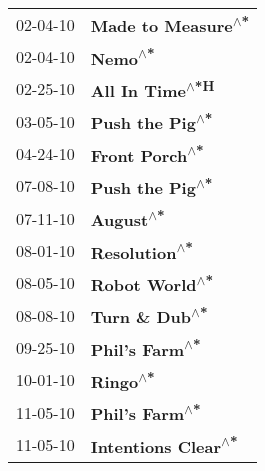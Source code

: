 \begin{supertabular}{p{0.25\columnwidth}p{0.75\columnwidth}}
 02-04-10 &   \textbf{Made to Measure\textsuperscript{$\wedge$*}} \\
 02-04-10 &              \textbf{Nemo\textsuperscript{$\wedge$*}} \\
 02-25-10 &      \textbf{All In Time\textsuperscript{$\wedge$*H}} \\
 03-05-10 &      \textbf{Push the Pig\textsuperscript{$\wedge$*}} \\
 04-24-10 &       \textbf{Front Porch\textsuperscript{$\wedge$*}} \\
 07-08-10 &      \textbf{Push the Pig\textsuperscript{$\wedge$*}} \\
 07-11-10 &            \textbf{August\textsuperscript{$\wedge$*}} \\
 08-01-10 &        \textbf{Resolution\textsuperscript{$\wedge$*}} \\
 08-05-10 &       \textbf{Robot World\textsuperscript{$\wedge$*}} \\
 08-08-10 &       \textbf{Turn \& Dub\textsuperscript{$\wedge$*}} \\
 09-25-10 &       \textbf{Phil's Farm\textsuperscript{$\wedge$*}} \\
 10-01-10 &             \textbf{Ringo\textsuperscript{$\wedge$*}} \\
 11-05-10 &       \textbf{Phil's Farm\textsuperscript{$\wedge$*}} \\
 11-05-10 &  \textbf{Intentions Clear\textsuperscript{$\wedge$*}} \\
\end{supertabular}

